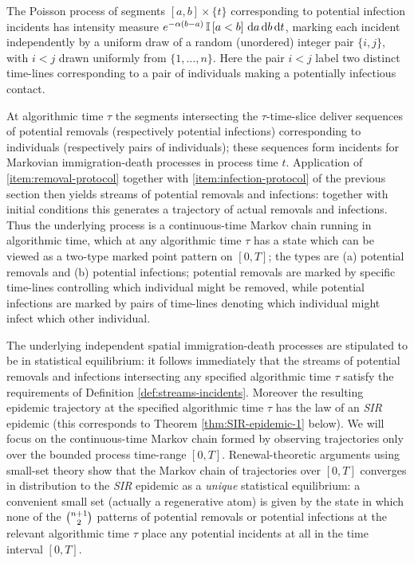 \documentclass[]{article}
\newcommand{\SIR}{\emph{SIR}\xspace}
\begin{document}
The Poisson process of 
segments 
\([a,b]\times \{t\}\)
corresponding to potential infection incidents
has intensity measure \(e^{-\alpha(b-a)}\operatorname{\mathbb{I}}\left[a<b\right]{\,\operatorname{d}}a{\,\operatorname{d}}b{\,\operatorname{d}}t\), 
marking each incident independently by a uniform draw
of a random (unordered) integer pair \(\{i,j\}\),
with \(i<j\) drawn uniformly from \(\{1, \ldots, n\}\).
Here the pair \(i<j\)
label two distinct time-lines
corresponding to a pair of individuals making a
potentially infectious contact.

At algorithmic time \(\tau\)
the segments intersecting the \(\tau\)-time-slice
deliver sequences of potential removals 
(respectively potential infections)
corresponding to 
individuals (respectively pairs of individuals);
these sequences form incidents for
Markovian immigration-death processes in process time \(t\).
Application of \ref{item:removal-protocol} together with \ref{item:infection-protocol}
of the previous section
then yields streams of potential removals and infections:
together with initial conditions this
generates a trajectory of actual removals and infections.
Thus the underlying
process 
is a continuous-time Markov chain running in algorithmic time,
which at any algorithmic time \(\tau\)
has a state which can be viewed as a two-type marked point pattern on \([0,T]\);
the types are (a) potential removals and (b) potential infections;
potential removals are marked by specific time-lines controlling which individual 
might be removed, 
while potential infections are marked by pairs of time-lines
denoting which individual might infect which other individual.%



The underlying independent spatial immigration-death processes are stipulated
to be in statistical equilibrium: it follows immediately that
the streams of potential removals and infections
intersecting any specified algorithmic time \(\tau\)
satisfy the requirements of 
Definition \ref{def:streams-incidents}. 
Moreover
the resulting epidemic trajectory 
at the specified algorithmic time \(\tau\)
has the law of an
\SIR epidemic
(this corresponds to
Theorem \ref{thm:SIR-epidemic-1} below).
We will focus on the continuous-time Markov chain formed by observing trajectories 
only over the bounded process time-range \([0,T]\).
Renewal-theoretic arguments using small-set theory 
show that the Markov chain of trajectories over \([0,T]\)  
converges 
in distribution
to the \SIR epidemic as a \emph{unique}
statistical equilibrium: a convenient small set
(actually a regenerative atom)
is given by the state in which none of
the \(\tbinom{n+1}{2}\) 
patterns of potential removals or potential infections
at the relevant algorithmic time \(\tau\)
place 
 any potential incidents at all in the time interval \([0,T]\).
\end{document}
